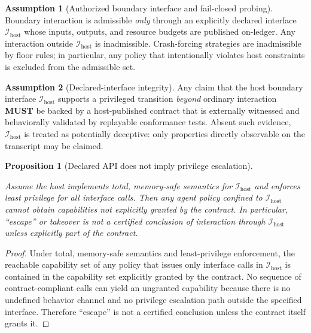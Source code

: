 \documentclass[11pt,a4paper]{article}
\newcommand{\MUST}{\textbf{MUST}}
\newcommand{\DependsOn}[1]{\par\noindent{\footnotesize\texttt{DependsOn: }\nolinkurl{#1}}\par}
\newtheorem{proposition}{Proposition}
\theoremstyle{definition}
\newtheorem{assumption}{Assumption}
\theoremstyle{remark}
\begin{document}
\begin{assumption}[Authorized boundary interface and fail-closed probing]\label{ass:hyper}
Boundary interaction is admissible \emph{only} through an explicitly declared interface $\mathcal I_{\mathrm{host}}$ whose inputs, outputs, and resource budgets are published on-ledger.
Any interaction outside $\mathcal I_{\mathrm{host}}$ is inadmissible.
Crash-forcing strategies are inadmissible by floor rules; in particular, any policy that intentionally violates host constraints is excluded from the admissible set.
\end{assumption}
\begin{assumption}[Declared-interface integrity]\label{ass:apiintegrity}
Any claim that the host boundary interface $\mathcal I_{\mathrm{host}}$ supports a privileged transition \emph{beyond} ordinary interaction \MUST{} be backed by a host-published contract that is externally witnessed and behaviorally validated by replayable conformance tests.
Absent such evidence, $\mathcal I_{\mathrm{host}}$ is treated as potentially deceptive: only properties directly observable on the transcript may be claimed.
\end{assumption}

\begin{proposition}[Declared API does not imply privilege escalation]\label{prop:api_noescalation}
\DependsOn{global=foundation;refs=[]}
Assume the host implements total, memory-safe semantics for $\mathcal I_{\mathrm{host}}$ and enforces least privilege for all interface calls.
Then any agent policy confined to $\mathcal I_{\mathrm{host}}$ cannot obtain capabilities not explicitly granted by the contract.
In particular, ``escape'' or takeover is not a certified conclusion of interaction through $\mathcal I_{\mathrm{host}}$ unless explicitly part of the contract.
\end{proposition}

\begin{proof}
Under total, memory-safe semantics and least-privilege enforcement, the reachable capability set of any policy that issues only interface calls in $\mathcal I_{\mathrm{host}}$ is contained in the capability set explicitly granted by the contract.
No sequence of contract-compliant calls can yield an ungranted capability because there is no undefined behavior channel and no privilege escalation path outside the specified interface.
Therefore ``escape'' is not a certified conclusion unless the contract itself grants it.
\end{proof}
\end{document}
